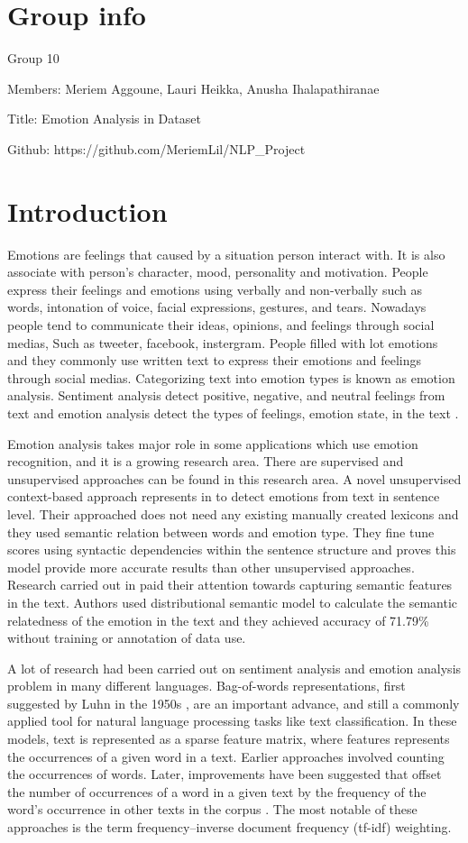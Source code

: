 \documentclass[conference]{IEEEtran}
\begin{document}
\section{Group info}
Group 10

Members: Meriem Aggoune, Lauri Heikka, Anusha Ihalapathiranae

Title: Emotion Analysis in Dataset

Github: https://github.com/MeriemLil/NLP\_Project

\section{Introduction}
Emotions are feelings that caused by a situation person interact with. It is also associate with person’s character, mood, personality and motivation. People express their feelings and emotions using verbally and non-verbally such as words, intonation of voice, facial expressions, gestures, and tears. Nowadays people tend to communicate their ideas, opinions, and feelings through social medias, Such as tweeter, facebook, instergram. People filled with lot emotions and they commonly use written text to express their emotions and feelings through social medias. Categorizing text into emotion types is known as emotion analysis. Sentiment analysis detect positive, negative, and neutral feelings from text and emotion analysis detect the types of feelings, emotion state, in the text \cite{emotiondetection}.

Emotion analysis takes major role in some applications which use emotion recognition, and it is a growing research area. There are supervised and unsupervised approaches can be found in this research area. A novel unsupervised context-based approach represents in \cite{unsupervisedemotiondetection} to detect emotions from text in sentence level. Their approached does not need any existing manually created lexicons and they used semantic relation between words and emotion type. They fine tune scores using syntactic dependencies within the sentence structure and proves this model provide more accurate results than other unsupervised approaches. Research carried out in \cite{jan2020emotion} paid their attention towards capturing semantic features in the text. Authors used distributional semantic model to calculate the semantic relatedness of the emotion in the text and they achieved accuracy of 71.79\% without training or annotation of data use.

A lot of research had been carried out on sentiment analysis and emotion analysis problem in many different languages. Bag-of-words representations, first suggested by Luhn in the 1950s \cite{luhn}, are an important advance, and still a commonly applied tool for natural language processing tasks like text classification. In these models, text is represented as a sparse feature matrix, where features represents the occurrences of a given word in a text. Earlier approaches involved counting the occurrences of words. Later, improvements have been suggested that offset the number of occurrences of a word in a given text by the frequency of the word's occurrence in other texts in the corpus \cite{tfidf}. The most notable of these approaches is the term frequency–inverse document frequency (tf-idf) weighting.
\end{document}
